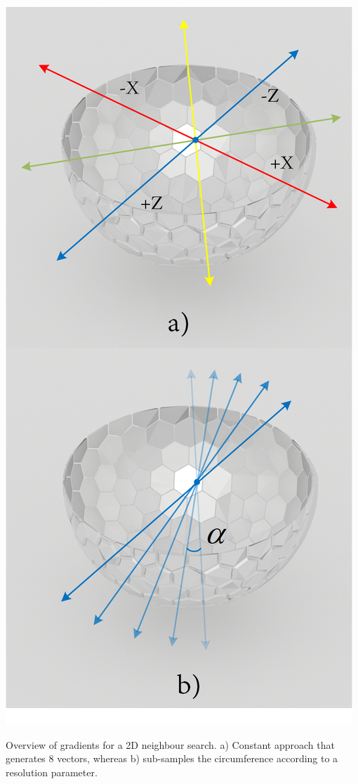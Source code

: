 \begin{marginfigure}[.cm]
    \centering
    \includegraphics[width=\linewidth]{figs/lidar_optimization/neighbour_search.png}
	\caption{Overview of gradients for a 2D neighbour search. a) Constant approach that generates 8 vectors, whereas b) sub-samples the circumference according to a resolution parameter.}
	\label{fig:neighbour_search}
\end{marginfigure}
